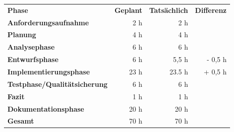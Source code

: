 \begin{tabu}{lrrr}
\rowfont{\bfseries\leavevmode\color{headingfont}}\textbf{Phase} & \textbf{Geplant} & \textbf{Tatsächlich} & \textbf{Differenz} \\
\textbf{Anforderungsaufnahme} & 2 h & 2 h & \\
\textbf{Planung} & 4 h & 4 h & \\ 
\textbf{Analysephase} & 6 h & 6 h  &  \\
\textbf{Entwurfsphase} & 6 h & 5,5 h & - 0,5 h \\
\textbf{Implementierungsphase} & 23 h  & 23.5 h  & + 0,5 h \\
\textbf{Testphase/Qualitätsicherung} & 6 h & 6 h & \\
\textbf{Fazit} & 1 h & 1 h & \\
\textbf{Dokumentationsphase} & 20 h & 20 h & \\
\hline
\hline
{}\textbf{Gesamt} & 70 h & 70 h & \\
\end{tabu}
